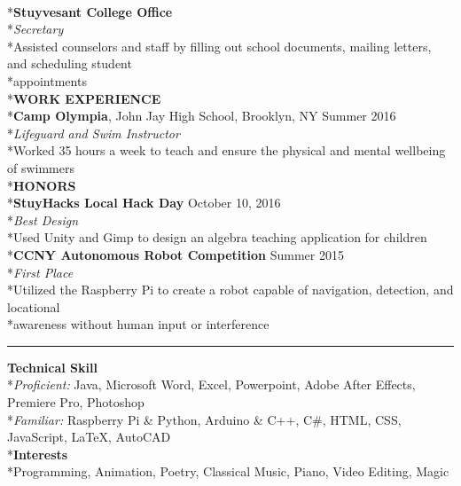 \documentclass[11pt]{letter}
\begin{document}
\begin{flushleft}
\\*\textbf{Stuyvesant College Office}
\\*\textit{Secretary}
\\*\qquad Assisted counselors and staff by filling out school documents, mailing letters, and scheduling student \\*\qquad appointments
\vspace{7.5mm}
\\*\large\textbf{WORK EXPERIENCE}
\\*\normalsize\textbf{Camp Olympia}, John Jay High School, Brooklyn, NY \hfill Summer 2016
\\*\textit{Lifeguard and Swim Instructor}
\\*\qquad Worked 35 hours a week to teach and ensure the physical and mental wellbeing of swimmers
\vspace{7.5mm}
\\*\large\textbf{HONORS}
\\*\normalsize\textbf{StuyHacks Local Hack Day} \hfill October 10, 2016
\\*\textit{Best Design}
\\*\qquad Used Unity and Gimp to design an algebra teaching application for children
\\*\textbf{CCNY Autonomous Robot Competition} \hfill Summer 2015
\\*\textit{First Place}
\\*\qquad Utilized the Raspberry Pi to create a robot capable of navigation, detection, and locational \\*\qquad awareness without human input or interference
\bigskip
\vspace{-5mm}\rule{\textwidth}{1pt}
\textbf{Technical Skill}
\\*\textit{Proficient: }Java, Microsoft Word, Excel, Powerpoint, Adobe After Effects, Premiere Pro, Photoshop
\\*\textit{Familiar: }Raspberry Pi \& Python, Arduino \& C++, C\#, HTML, CSS, JavaScript, LaTeX, AutoCAD
\\*\textbf{Interests}
\\*Programming, Animation, Poetry, Classical Music, Piano, Video Editing, Magic


\end{flushleft}
\end{document}
